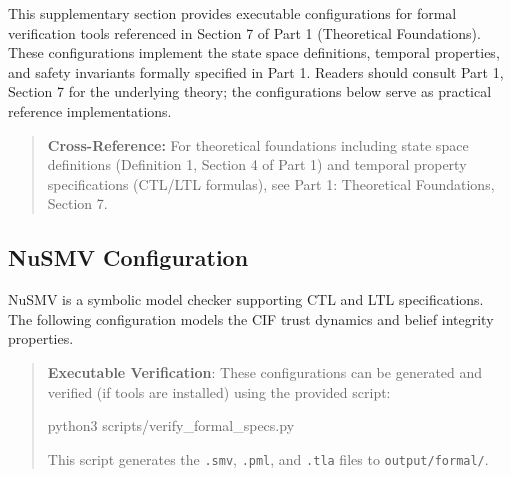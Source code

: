 \documentclass[
]{article}
\newenvironment{Shaded}{}{}
\newcommand{\ExtensionTok}[1]{#1}
\newcommand{\NormalTok}[1]{#1}
\begin{document}
This supplementary section provides executable configurations for formal
verification tools referenced in Section 7 of Part 1 (Theoretical
Foundations). These configurations implement the state space
definitions, temporal properties, and safety invariants formally
specified in Part 1. Readers should consult Part 1, Section 7 for the
underlying theory; the configurations below serve as practical reference
implementations.

\begin{quote}
\textbf{Cross-Reference:} For theoretical foundations including state
space definitions (Definition 1, Section 4 of Part 1) and temporal
property specifications (CTL/LTL formulas), see Part 1: Theoretical
Foundations, Section 7.
\end{quote}

\subsection{NuSMV Configuration}\label{sec:nusmv-config}

NuSMV is a symbolic model checker supporting CTL and LTL specifications.
The following configuration models the CIF trust dynamics and belief
integrity properties.

\begin{quote}
\textbf{Executable Verification}: These configurations can be generated
and verified (if tools are installed) using the provided script:

\begin{Shaded}
\begin{Highlighting}[]
\ExtensionTok{python3}\NormalTok{ scripts/verify\_formal\_specs.py}
\end{Highlighting}
\end{Shaded}

This script generates the \texttt{.smv}, \texttt{.pml}, and
\texttt{.tla} files to \texttt{output/formal/}.
\end{quote}
\end{document}
